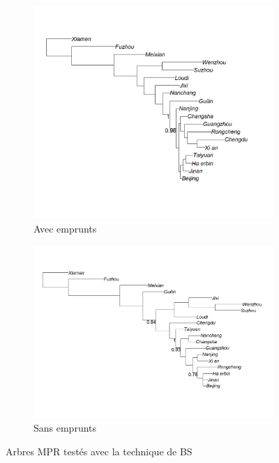 \documentclass{scrbook}
\newcounter{c}[subsubsection]
\begin{document}
\begin{sloppypar}
\begin{figure}[htbp]
\flushleft
\begin{subfigure}{.5\textwidth}
\centering
\includegraphics[scale=.2]{Figure/MPR_BS_with}
\caption{Avec emprunts}
\end{subfigure}

\begin{subfigure}{.5\textwidth}
\centering
\includegraphics[scale=.2]{Figure/MPR_BS_without}
\caption{Sans emprunts}
\end{subfigure}
\caption{Arbres MPR testés avec la technique de BS}
\label{Fig:MPR}
\end{figure}


\end{sloppypar}
\end{document}
